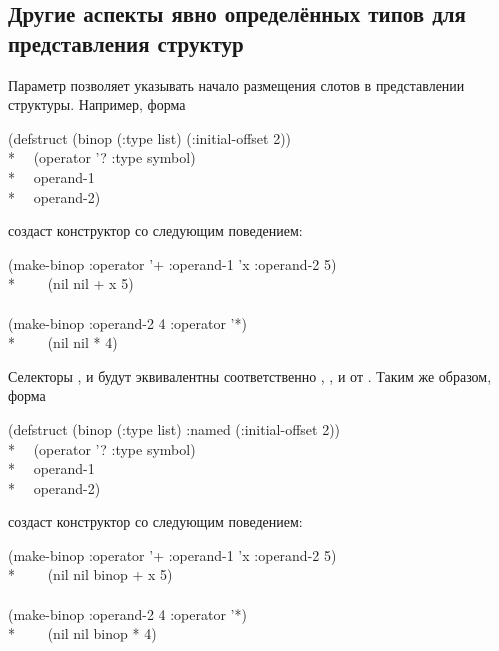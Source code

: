 \subsection{Другие аспекты явно определённых типов для представления структур}
\label{DEFSTRUCT-INITIAL-OFFSET}

Параметр  позволяет указывать начало размещения слотов в
представлении структуры. Например, форма
\begin{lisp}
(defstruct (binop (:type list) (:initial-offset 2)) \\*
~~(operator '? :type symbol) \\*
~~operand-1 \\*
~~operand-2)
\end{lisp}
создаст конструктор  со следующим поведением:
\begin{lisp}
(make-binop :operator '+ :operand-1 'x :operand-2 5) \\*
~~~\EV\ (nil nil + x 5) \\
\\
(make-binop :operand-2 4 :operator '*) \\*
~~~\EV\ (nil nil * {\nil} 4)
\end{lisp}
Селекторы
,  и  
будут эквивалентны соответственно ,
, и  от .
Таким же образом, форма
\begin{lisp}
(defstruct (binop (:type list) :named (:initial-offset 2)) \\*
~~(operator '? :type symbol) \\*
~~operand-1 \\*
~~operand-2)
\end{lisp}
создаст конструктор  со следующим поведением:
\begin{lisp}
(make-binop :operator '+ :operand-1 'x :operand-2 5) \\*
~~~\EV\ (nil nil binop + x 5) \\
\\
(make-binop :operand-2 4 :operator '*) \\*
~~~\EV\ (nil nil binop * {\nil} 4)
\end{lisp}

